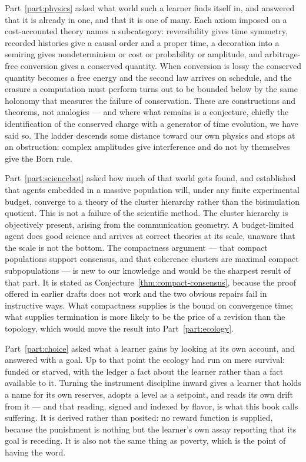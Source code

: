 Part~\ref{part:physics} asked what world such a learner finds itself in,
and answered that it is already in one, and that it is one of many.
Each axiom imposed on a cost-accounted theory names a subcategory:
reversibility gives time symmetry, recorded histories give a causal order
and a proper time, a decoration into a semiring gives nondeterminism or
cost or probability or amplitude, and arbitrage-free conversion gives a
conserved quantity.
When conversion is lossy the conserved quantity becomes a free energy and
the second law arrives on schedule, and the erasure a computation must
perform turns out to be bounded below by the same holonomy that measures
the failure of conservation.
These are constructions and theorems, not analogies --- and where what
remains is a conjecture, chiefly the identification of the conserved
charge with a generator of time evolution, we have said so.
The ladder descends some distance toward our own physics and stops at an
obstruction: complex amplitudes give interference and do not by
themselves give the Born rule.

Part~\ref{part:sciencebot} asked how much of that world gets found, and
established that agents embedded in a massive population will, under any
finite experimental budget, converge to a theory of the cluster hierarchy
rather than the bisimulation quotient.
This is not a failure of the scientific method.
The cluster hierarchy is objectively present, arising from the
communication geometry.
A budget-limited agent does good science and arrives at correct theories
at its scale, unaware that the scale is not the bottom.
The compactness argument --- that compact populations support consensus,
and that coherence clusters are maximal compact subpopulations --- is new
to our knowledge and would be the sharpest result of that part.
It is stated as Conjecture~\ref{thm:compact-consensus}, because the
proof offered in earlier drafts does not work and the two obvious
repairs fail in instructive ways.
What compactness supplies is the bound on convergence time; what
supplies termination is more likely to be the price of a revision than
the topology, which would move the result into
Part~\ref{part:ecology}.

Part~\ref{part:choice} asked what a learner gains by looking at its own
account, and answered with a goal.
Up to that point the ecology had run on mere survival: funded or starved,
with the ledger a fact about the learner rather than a fact available to
it.
Turning the instrument discipline inward gives a learner that holds a
name for its own reserves, adopts a level as a setpoint, and reads its
own drift from it --- and that reading, signed and indexed by flavor, is
what this book calls suffering.
It is derived rather than posited: no reward function is supplied,
because the punishment is nothing but the learner's own assay reporting
that its goal is receding.
It is also not the same thing as poverty, which is the point of having
the word.

